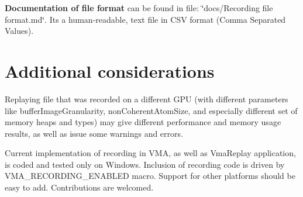 {\bfseries Documentation of file format} can be found in file\+: \char`\"{}docs/\+Recording file format.\+md\char`\"{}. It\textquotesingle{}s a human-\/readable, text file in C\+SV format (Comma Separated Values).\hypertarget{record_and_replay_record_and_replay_additional_considerations}{}\section{Additional considerations}\label{record_and_replay_record_and_replay_additional_considerations}

\begin{DoxyItemize}
\item Replaying file that was recorded on a different G\+PU (with different parameters like {\ttfamily buffer\+Image\+Granularity}, {\ttfamily non\+Coherent\+Atom\+Size}, and especially different set of memory heaps and types) may give different performance and memory usage results, as well as issue some warnings and errors.
\item Current implementation of recording in V\+MA, as well as Vma\+Replay application, is coded and tested only on Windows. Inclusion of recording code is driven by {\ttfamily V\+M\+A\+\_\+\+R\+E\+C\+O\+R\+D\+I\+N\+G\+\_\+\+E\+N\+A\+B\+L\+ED} macro. Support for other platforms should be easy to add. Contributions are welcomed. 
\end{DoxyItemize}